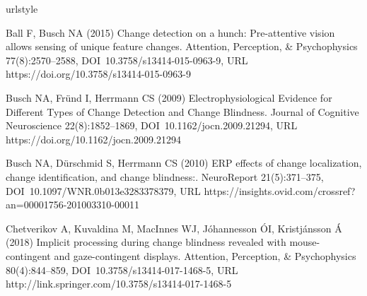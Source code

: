 \begin{thebibliography}{48}
\providecommand{\natexlab}[1]{#1}
\providecommand{\url}[1]{{#1}}
\providecommand{\urlprefix}{URL }
\expandafter\ifx\csname urlstyle\endcsname\relax
  \providecommand{\doi}[1]{DOI~\discretionary{}{}{}#1}\else
  \providecommand{\doi}{DOI~\discretionary{}{}{}\begingroup
  \urlstyle{rm}\Url}\fi
\providecommand{\eprint}[2][]{\url{#2}}

Ball F, Busch NA (2015) Change detection on a hunch: {Pre}-attentive vision
  allows sensing of unique feature changes. Attention, Perception, \&
  Psychophysics 77(8):2570--2588, \doi{10.3758/s13414-015-0963-9},
  \urlprefix\url{https://doi.org/10.3758/s13414-015-0963-9}

Busch NA, Fr\"und I, Herrmann CS (2009) Electrophysiological {Evidence} for
  {Different} {Types} of {Change} {Detection} and {Change} {Blindness}. Journal
  of Cognitive Neuroscience 22(8):1852--1869, \doi{10.1162/jocn.2009.21294},
  \urlprefix\url{https://doi.org/10.1162/jocn.2009.21294}

Busch NA, D\"urschmid S, Herrmann CS (2010) {ERP} effects of change
  localization, change identification, and change blindness:. NeuroReport
  21(5):371--375, \doi{10.1097/WNR.0b013e3283378379},
  \urlprefix\url{https://insights.ovid.com/crossref?an=00001756-201003310-00011}

Chetverikov A, Kuvaldina M, MacInnes WJ, J\'ohannesson \'OI, Kristj\'ansson \'A
  (2018) Implicit processing during change blindness revealed with
  mouse-contingent and gaze-contingent displays. Attention, Perception, \&
  Psychophysics 80(4):844--859, \doi{10.3758/s13414-017-1468-5},
  \urlprefix\url{http://link.springer.com/10.3758/s13414-017-1468-5}


\end{thebibliography}

%



